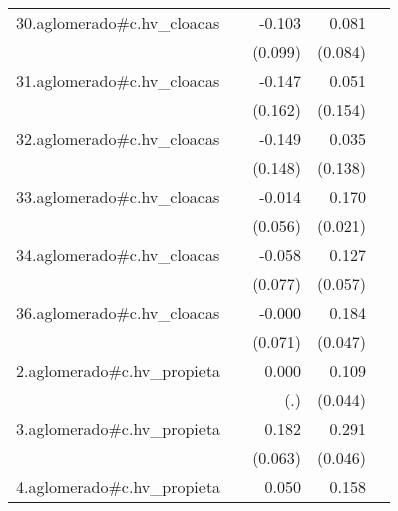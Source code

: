 {\begin{longtable}{l*{4}{D{.}{.}{-1}}}
\addlinespace
30.aglomerado#c.hv\_cloacas&                     &      -0.103         &       0.081         &                     \\
            &                     &     (0.099)         &     (0.084)         &                     \\
\addlinespace
31.aglomerado#c.hv\_cloacas&                     &      -0.147         &       0.051         &                     \\
            &                     &     (0.162)         &     (0.154)         &                     \\
\addlinespace
32.aglomerado#c.hv\_cloacas&                     &      -0.149         &       0.035         &                     \\
            &                     &     (0.148)         &     (0.138)         &                     \\
\addlinespace
33.aglomerado#c.hv\_cloacas&                     &      -0.014         &       0.170\sym{***}&                     \\
            &                     &     (0.056)         &     (0.021)         &                     \\
\addlinespace
34.aglomerado#c.hv\_cloacas&                     &      -0.058         &       0.127\sym{*}  &                     \\
            &                     &     (0.077)         &     (0.057)         &                     \\
\addlinespace
36.aglomerado#c.hv\_cloacas&                     &      -0.000         &       0.184\sym{***}&                     \\
            &                     &     (0.071)         &     (0.047)         &                     \\
\addlinespace
2.aglomerado#c.hv\_propieta&                     &       0.000         &       0.109\sym{*}  &                     \\
            &                     &         (.)         &     (0.044)         &                     \\
\addlinespace
3.aglomerado#c.hv\_propieta&                     &       0.182\sym{**} &       0.291\sym{***}&                     \\
            &                     &     (0.063)         &     (0.046)         &                     \\
\addlinespace
4.aglomerado#c.hv\_propieta&                     &       0.050         &       0.158\sym{***}&                     \\

\end{longtable}}
